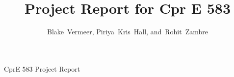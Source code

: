 \documentclass[journal]{IEEEtran}
\begin{document}
%
\title{Project Report for Cpr E 583}
%
%
%

\author{Blake~Vermeer,
        Piriya~Kris~Hall,
        and~Rohit~Zambre}%

% 
%



%
{CprE 583 Project Report}
% 
\end{document}
